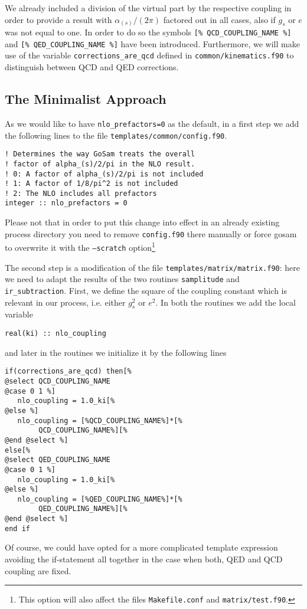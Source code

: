 \documentclass[11pt,a4paper]{refrep}
\begin{document}
We already included a division of the virtual part by the respective coupling
in order to provide a result with $\alpha_{(s)}/(2\pi)$ factored out in all
cases, also if $g_s$ or $e$ was not equal to one. In order to do so
the symbols \lstinline{[% QCD_COUPLING_NAME %]}
and \lstinline{[% QED_COUPLING_NAME %]}
have been introduced. Furthermore, we will make use of the
variable \texttt{corrections\_are\_qcd} defined in
\texttt{common/kinematics.f90} to distinguish between QCD and QED
corrections.

\subsection{The Minimalist Approach}
As we would like to have \texttt{nlo\_prefactors=0} as the default,
in a first step we add the following lines to the file
\texttt{templates/\hspace{0pt}common/\hspace{0pt}config.f90}.
\begin{lstlisting}
! Determines the way GoSam treats the overall
! factor of alpha_(s)/2/pi in the NLO result.
! 0: A factor of alpha_(s)/2/pi is not included
! 1: A factor of 1/8/pi^2 is not included
! 2: The NLO includes all prefactors
integer :: nlo_prefactors = 0
\end{lstlisting}
\attention Please not that in order to put this change into effect in an
already existing process directory you need to remove \texttt{config.f90}
there manually or force gosam to overwrite it with the \texttt{--scratch}
option\footnote{This option will also affect the files \texttt{Makefile.conf}
and \texttt{matrix/test.f90}.}

The second step is a modification of the file
\texttt{templates/\hspace{0pt}matrix/\hspace{0pt}matrix.f90}:
here we need to adapt the results
of the two routines \texttt{samplitude} and
\texttt{ir\_subtraction}. First, we define the square of the coupling
constant which is relevant in our process, i.e. either $g_s^2$ or $e^2$.
In both the routines we add the local variable
\begin{lstlisting}
real(ki) :: nlo_coupling
\end{lstlisting}
and later in the routines we initialize it by the following lines
\begin{lstlisting}
if(corrections_are_qcd) then[%
@select QCD_COUPLING_NAME
@case 0 1 %]
   nlo_coupling = 1.0_ki[%
@else %]
   nlo_coupling = [%QCD_COUPLING_NAME%]*[%
        QCD_COUPLING_NAME%][%
@end @select %]
else[%
@select QED_COUPLING_NAME
@case 0 1 %]
   nlo_coupling = 1.0_ki[%
@else %]
   nlo_coupling = [%QED_COUPLING_NAME%]*[%
        QED_COUPLING_NAME%][%
@end @select %]
end if
\end{lstlisting}
Of course, we could have opted for a more complicated template
expression avoiding the if-statement all together in the case
when both, QED and QCD coupling are fixed.
\end{document}
